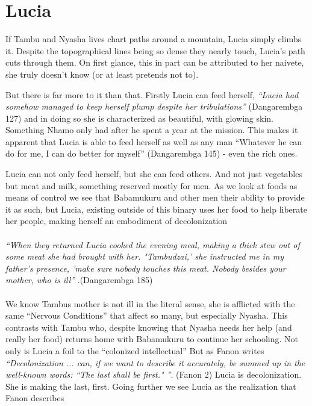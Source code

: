 \documentclass{article}
\begin{document}
\section*{Lucia}
If Tambu and Nyasha lives chart paths around a mountain, Lucia simply climbs it. Despite the topographical lines being so dense they nearly touch, Lucia's path cuts through them. On first glance, this in part can be attributed to her naivete, she truly doesn't know (or at least pretends not to). 

But there is far more to it than that. Firstly Lucia can feed herself, \textit{``Lucia had somehow managed to keep herself plump despite her tribulations''} (Dangarembga 127) and in doing so she is characterized as beautiful, with glowing skin. Something Nhamo only had after he spent a year at the mission. This makes it apparent that Lucia is able to feed herself as well as any man ``Whatever he can do for me, I can do better for myself'' (Dangarembga 145) - even the rich ones. 

Lucia can not only feed herself, but she can feed others. And not just vegetables but meat and milk, something reserved mostly for men. As we look at foods as means of control we see that Babamukuru and other men their ability to provide it as such, but Lucia, existing outside of this binary uses her food to help liberate her people, making herself an embodiment of decolonization \paragraph{}
\textit{``When they returned Lucia cooked the evening meal, making a thick stew out of some meat she had brought with her. "Tambudzai,' she instructed me in my father's presence, 'make sure nobody touches this meat. Nobody besides your mother, who is ill'' }.(Dangarembga 185)
\paragraph{}
 We know Tambus mother is not ill in the literal sense,  she is afflicted with the same ``Nervous Conditions'' that affect so many, but especially Nyasha. This contrasts with Tambu who, despite knowing that Nyasha needs her help (and really her food) returns home with Babamukuru to continue her schooling. Not only is Lucia a foil to the ``colonized intellectual'' But as Fanon writes \textit{``Decolonization ... can, if we want to describe it accurately, be summed up in the well-known words: ``The last shall be first." ''}. (Fanon 2) Lucia is decolonization. She is making the last, first. Going further we see Lucia as the realization that Fanon describes 
\end{document}
